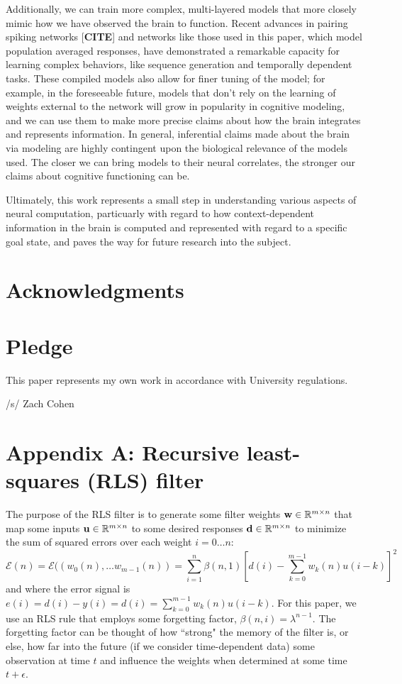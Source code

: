 \documentclass[12pt,a4paper,final]{iopart}
\begin{document}
Additionally, we can train more complex, multi-layered models that more closely mimic how we have observed the brain to function. Recent advances in pairing spiking networks [\textbf{CITE}] and networks like those used in this paper, which model population averaged responses, have demonstrated a remarkable capacity for learning complex behaviors, like sequence generation and temporally dependent tasks. These compiled models also allow for finer tuning of the model; for example, in the foreseeable future, models that don't rely on the learning of weights external to the network will grow in popularity in cognitive modeling, and we can use them to make more precise claims about how the brain integrates and represents information. In general, inferential claims made about the brain via modeling are highly contingent upon the biological relevance of the models used. The closer we can bring models to their neural correlates, the stronger our claims about cognitive functioning can be.

Ultimately, this work represents a small step in understanding various aspects of neural computation, particuarly with regard to how context-dependent information in the brain is computed and represented with regard to a specific goal state, and paves the way for future research into the subject.

\newpage

\section*{Acknowledgments}

\medskip

\section*{Pledge}
This paper represents my own work in accordance with University regulations.

/s/ Zach Cohen

\printbibliography


\newpage

\section*{Appendix A: Recursive least-squares (RLS) filter}
The purpose of the RLS filter is to generate some filter weights ${\bf w} \in \mathbb{R}^{m \times n}$ that map some inputs ${\bf u} \in \mathbb{R}^{m \times n}$ to some desired responses ${\bf d} \in \mathbb{R}^{m \times n}$ to minimize the sum of squared errors over each weight $i = 0\dots n$:
\[
    \mathcal{E}(n) = \mathcal{E}((w_0(n), \dots w_{m-1}(n)) = \sum_{i = 1}^n \beta(n, 1)[d(i) - \sum_{k = 0}^{m - 1}w_k(n)u(i-k)]^2
\]
and where the error signal is $e(i) = d(i) - y(i) = d(i) = \sum_{k=0}^{m-1} w_k(n)u(i-k)$. For this paper, we use an RLS rule that employs some forgetting factor, $\beta(n,i) = \lambda^{n-1}$. The forgetting factor can be thought of how ``strong" the memory of the filter is, or else, how far into the future (if we consider time-dependent data) some observation at time $t$ and influence the weights when determined at some time $t + \epsilon$. 
\end{document}

